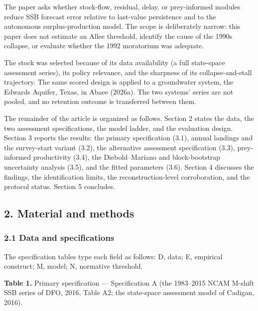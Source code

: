 \documentclass[11pt]{article}
\begin{document}
The paper asks whether stock-flow, residual, delay, or prey-informed
modules reduce SSB forecast error relative to last-value persistence and
to the autonomous surplus-production model. The scope is deliberately
narrow: this paper does not estimate an Allee threshold, identify the
cause of the 1990s collapse, or evaluate whether the 1992 moratorium was
adequate.

The stock was selected because of its data availability (a full
state-space assessment series), its policy relevance, and the sharpness
of its collapse-and-stall trajectory. The same scored design is applied to a groundwater system, the Edwards
Aquifer, Texas, in Abaee (2026a). The two systems' series are not
pooled, and no retention outcome is transferred between them.

The remainder of the article is organized as follows. Section 2 states
the data, the two assessment specifications, the model ladder, and the
evaluation design. Section 3 reports the results: the primary
specification (3.1), annual landings and the survey-start variant (3.2),
the alternative assessment specification (3.3), prey-informed
productivity (3.4), the Diebold--Mariano and block-bootstrap
uncertainty analysis (3.5), and the fitted parameters (3.6).
Section 4 discusses the findings, the identification limits, the
reconstruction-level corroboration, and the protocol status.
Section 5 concludes.

\subsection{2. Material and methods}\label{material-and-methods}

\subsubsection{2.1 Data and
specifications}\label{data-and-specifications}

The specification tables type each field as follows: D, data; E,
empirical construct; M, model; N, normative threshold.

\textbf{Table 1.} Primary specification --- Specification A (the
1983--2015 NCAM M-shift SSB series of DFO, 2016, Table A2; the
state-space assessment model of Cadigan, 2016).
\end{document}
